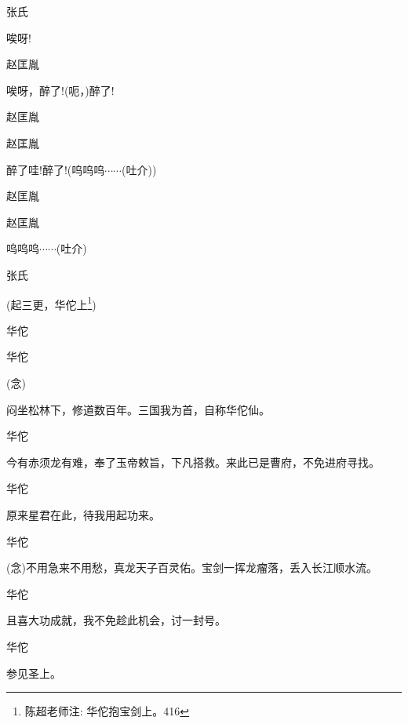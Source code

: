 {张氏\hspace{30pt}~

唉呀!}

{赵匡胤\hspace{20pt}~

唉呀，醉了!(呃，)醉了!}

{赵匡胤

 }

{赵匡胤\hspace{20pt}~

醉了哇!醉了!(呜呜呜$\cdots{}\cdots{}$(吐介))}

{赵匡胤\hspace{20pt}~

 }

{赵匡胤\hspace{20pt}~

呜呜呜$\cdots{}\cdots{}$(吐介)}

{张氏

 }

{(起三更，华佗上}\footnote{ 陈超老师注: 华佗抱宝剑上。{416}}{)}

{华佗\hspace{30pt}~

 }

{华佗\hspace{30pt}~

({\akai 念})

闷坐松林下，修道数百年。三国我为首，自称华佗仙。}

{华佗

今有赤须龙有难，奉了玉帝敕旨，下凡搭救。来此已是曹府，不免进府寻找。}

{华佗\hspace{30pt}~

原来星君在此，待我用起功来。}

{华佗

({\akai 念})不用急来不用愁，真龙天子百灵佑。宝剑一挥龙瘤落，丢入长江顺水流。}

{华佗\hspace{30pt}~

且喜大功成就，我不免趁此机会，讨一封号。}

{华佗\hspace{30pt}~

参见圣上。}

